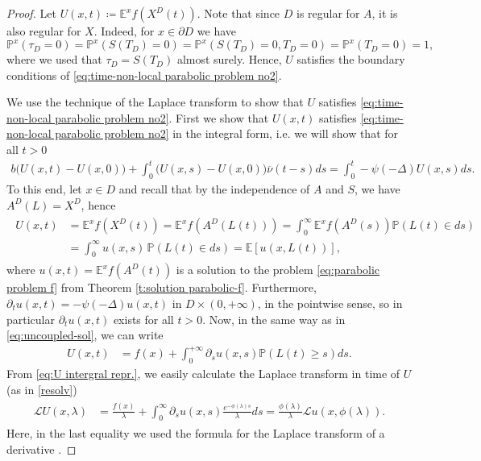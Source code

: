 \documentclass[reqno]{amsart}
\theoremstyle{remark}
\numberwithin{equation}{section} %
\newcommand{\p}{\mathds{P}}
\newcommand{\Lpsi}{\psi(-\Delta)}
\newcommand{\EE}{\mathds{E}}
\newcommand{\PP}{\mathds{P}}
\newcommand{\LL}{\mathcal{L}}
\newcommand{\1}{\mathds{1}}
\begin{document}
	\begin{proof}
		Let $U(x,t)\coloneqq \EE^xf(X^D(t))$. Note that since $D$ is regular for $A$, it is also regular for $X$. Indeed, for $x\in \partial D$ we have
		$$\mathds{P}^x(\tau_D=0)=\mathds{P}^x(S(T_D)=0)=\mathds{P}^x(S(T_D)=0,T_D=0)=\mathds{P}^x(T_D=0)=1,$$
		where we used that $\tau_D=S(T_D)$ almost surely. Hence, $U$ satisfies the boundary conditions of \eqref{eq:time-non-local parabolic problem no2}.
		
		We use the technique of the Laplace transform to show that $U$ satisfies \eqref{eq:time-non-local parabolic problem no2}. First we show that $U(x,t)$ satisfies \eqref{eq:time-non-local parabolic problem no2} in the integral form, i.e. we will show that for all $t>0$
		\begin{align}\label{eq:time non-local integral form}
			b\big(U(x,t)-U(x,0)\big)+\int_0^t \big(U(x,s)-U(x,0)\big)\overline \nu(t-s)ds=\int_0^t -\Lpsi U(x,s)ds.
		\end{align}
		To this end, let $x\in D$ and recall that by the independence of $A$ and $S$, we have $A^D(L)=X^D$, hence
		\begin{align}
			\begin{split}
				U(x,t)&=\EE^xf(X^D(t))=\EE^xf(A^D(L(t)))=\int_0^\infty \EE^xf(A^D(s))\p(L(t)\in ds)\\&=\int_0^\infty u(x,s)\,\p(L(t)\in ds)=\mathds{E}[u(x,L(t))],
			\end{split}\label{eq:U relative to u}
		\end{align}
		where $u(x,t)=\EE^xf(A^D(t))$ is a solution  to the problem \eqref{eq:parabolic problem f} from Theorem \ref{t:solution parabolic-f}. Furthermore, $\partial_tu(x,t)=-\Lpsi u(x,t)$ in $D\times (0,+\infty)$, in the pointwise sense, so in particular $\partial_t u(x,t)$ exists for all $t>0$. Now, in the same way as in \eqref{eq:uncoupled-sol}, we can write 
		\begin{align}\label{eq:U intergral repr.}
			U(x,t)&=f(x)+\int_0^{+\infty} \partial_s u(x,s)\PP(L(t)\ge s)ds.
		\end{align}
		From \eqref{eq:U intergral repr.}, we easily calculate the Laplace transform in time of $U$ (as in \eqref{resolv})
		\begin{align}
			\begin{split}
				\LL U(x,\lambda)&=\frac{f(x)}{\lambda}+\int_0^\infty  \partial_s u(x,s)\frac{e^{-\phi(\lambda)s}}{\lambda}ds=\frac{\phi(\lambda)}{\lambda}\LL u(x,\phi(\lambda)).
			\end{split}\label{eq:U laplace to u}
		\end{align}
		Here, in the  last equality we used the formula for the Laplace transform of a derivative \cite[Proposition 1.6.6]{arendt2001cauchy}.
		

\end{proof}
\end{document}
